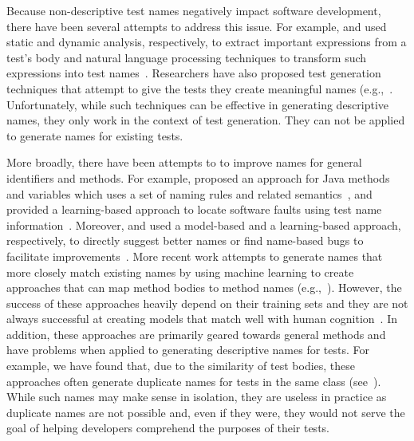 Because non-descriptive test names negatively impact software development, there have been several attempts to address this issue. 
%
For example, \citeauthor{zhang2016towards} and \citeauthor{daka2017generating} used static and dynamic analysis, respectively, to extract important expressions from a test's body and natural language processing techniques to transform such expressions into test names~\cite{zhang2016towards, daka2017generating}.
%
Researchers have also proposed test generation techniques that attempt to give the tests they create meaningful names (e.g.,~\cite{thummalapenta2009mseqgen, fraser2011evosuite, zhang2015automatically}.
%
Unfortunately, while such techniques can be effective in generating descriptive names, they only work in the context of test generation.
%
They can not be applied to generate names for existing tests.


More broadly, there have been attempts to to improve names for general identifiers and methods.
%
For example, \citeauthor{host2009debugging} proposed an approach for Java methods and variables which uses a set of naming rules and related semantics~\cite{host2009debugging}, and \citeauthor{li2019deepfl} provided a learning-based approach to locate software faults using test name information~\cite{li2019deepfl}.
%
Moreover, \citeauthor{allamanis2015suggesting} and \citeauthor{pradel2018deepbugs} used a model-based and a learning-based approach, respectively, to directly suggest better names or find name-based bugs to facilitate improvements~\cite{allamanis2015suggesting, pradel2018deepbugs}.
%
More recent work attempts to generate names that more closely match existing names by using machine learning to create approaches that can map method bodies to method names (e.g.,~\cite{alon2018code2seq, alon2019code2vec}).
%
However, the success of these approaches heavily depend on their training sets and they are not always successful at creating models that match well with human cognition~\cite{lison2015introduction}.
%
In addition, these approaches are primarily geared towards general methods and have problems when applied to generating descriptive names for tests.
%
For example, we have found that, due to the similarity of test bodies, these approaches often generate duplicate names for tests in the same class (see~\cite{CodeResult}).
%
While such names may make sense in isolation, they are useless in practice as duplicate names are not possible and, even if they were, they would not serve the goal of helping developers comprehend the purposes of their tests.


